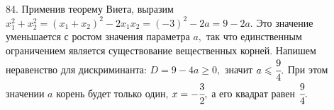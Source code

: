 84. Применив теорему Виета, выразим $x_1^2+x_2^2=(x_1+x_2)^2-2x_1x_2=(-3)^2-2a=9-2a.$ Это значение уменьшается с ростом значения параметра $a,$ так что единственным ограничением является существование вещественных корней. Напишем неравенство для дискриминанта: $D=9-4a\geqslant0,$ значит $a\leqslant \cfrac{9}{4}.$ При этом значении $a$ корень будет только один, $x=-\cfrac{3}{2},$ а его квадрат равен $\cfrac{9}{4}.$\\
